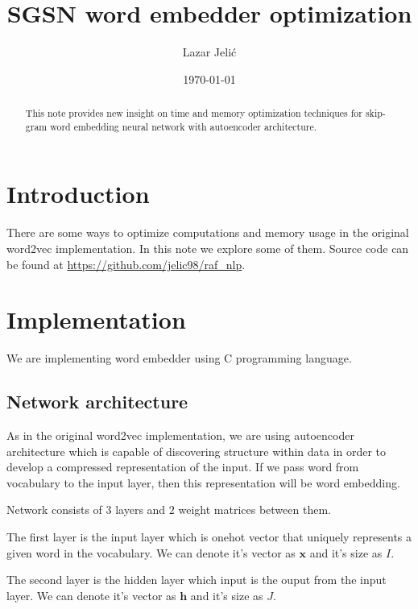 \documentclass{article}
\title{SGSN word embedder optimization}
\author{Lazar Jelić}
\date{\today}
\begin{document}
\maketitle

\begin{abstract}

This note provides new insight on time and memory optimization techniques for
skip-gram word embedding neural network with autoencoder architecture.

\end{abstract}

\pagebreak

\section{Introduction}

There are some ways to optimize computations and memory usage in the
original word2vec implementation. In this note we explore some of them. Source
code can be found at \url{https://github.com/jelic98/raf_nlp}.

\pagebreak

\section{Implementation}

We are implementing word embedder using C programming language.

\subsection{Network architecture}

As in the original word2vec implementation, we are using autoencoder
architecture which is capable of discovering structure within data in order
to develop a compressed representation of the input. If we pass word from
vocabulary to the input layer, then this representation will be word embedding.

\medbreak

Network consists of $3$ layers and $2$ weight matrices between them.

The first layer is the input layer which is onehot vector that uniquely represents a given word in the vocabulary.
We can denote it's vector as $\boldsymbol{x}$ and it's size as $I$.

\medbreak

The second layer is the hidden layer which input is the ouput from the input
layer.
We can denote it's vector as $\boldsymbol{h}$ and it's size as $J$.
\end{document}
